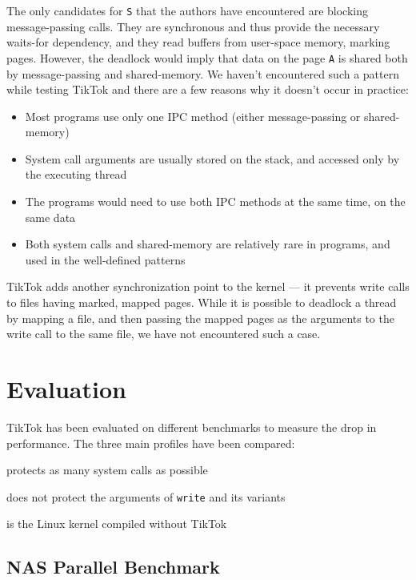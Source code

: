 \documentclass[conference]{IEEEtran}
\newcommand{\sysname}{TikTok}
\begin{document}
The only candidates for \texttt{S} that the authors have encountered are
blocking message-passing calls. They are synchronous and thus provide the
necessary waits-for dependency, and they read buffers from user-space memory, marking
pages. However, the deadlock would imply that data on the page \texttt{A} is shared both by
message-passing and shared-memory. We haven't encountered such a pattern while
testing \sysname{} and there are a few reasons why it doesn't occur in practice:

\begin{itemize}
  \item Most programs use only one IPC method (either message-passing or shared-memory)
  \item System call arguments are usually stored on the stack, and accessed only by the executing thread
  \item The programs would need to use both IPC methods at the same time, on the same data
  \item Both system calls and shared-memory are relatively rare in programs, and used in the well-defined patterns
\end{itemize}

\sysname{} adds another synchronization point to the kernel --- it prevents
write calls to files having marked, mapped pages. While it is possible to
deadlock a thread by mapping a file, and then passing the mapped pages as the
arguments to the write call to the same file, we have not encountered such a
case.

\section{Evaluation}
\label{sec:evaluation}

\sysname{} has been evaluated on different benchmarks to measure the drop in performance.
The three main profiles have been compared:
\begin{LaTeXdescription}
  \item[\sysname{} On] protects as many system calls as possible
  \item[\sysname{} Partial] does not protect the arguments of \texttt{write} and its variants
  \item[\sysname{} Off] is the Linux kernel compiled without \sysname{}  
\end{LaTeXdescription}

\subsection{NAS Parallel Benchmark}
\label{subsec:npb}
\end{document}
